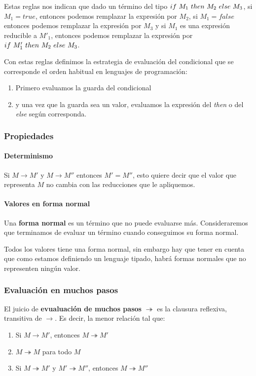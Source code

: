 \vspace*{5mm}
Estas reglas nos indican que dado un término del tipo $if~ M_1~ then~ M_2~ else~ M_3$, si $M_1 = true$, entonces podemos remplazar la expresión por $M_2$, si $M_1=false$ entonces podemos remplazar la expresión por $M_3$ y si $M_1$ es una expresión reducible a $M'_1$, entonces podemos remplazar la expresión por $if~ M'_1~ then~ M_2~ else~ M_3$.

Con estas reglas definimos la estrategia de evaluación del condicional que se corresponde el orden habitual en lenguajes de programación:
\begin{enumerate}
    \item Primero evaluamos la guarda del condicional
    \item y una vez que la guarda sea un valor, evaluamos la expresión del \textit{then} o del \textit{else} según corresponda.
\end{enumerate}

\subsubsection{Propiedades}

\paragraph{Determinismo} Si $M\to M'$ y $M\to M''$ entonces $M' = M''$, esto quiere decir que el valor que representa $M$ no cambia con las reducciones que le apliquemos.

\paragraph{Valores en forma normal} Una \textbf{forma normal} es un término que no puede evaluarse más. Consideraremos que terminamos de evaluar un término cuando conseguimos su forma normal.

Todos los valores tiene una forma normal, sin embargo hay que tener en cuenta que como estamos definiendo un lenguaje tipado, habrá formas normales que no representen ningún valor.

\subsubsection{Evaluación en muchos pasos}
El juicio de \textbf{evualuación de muchos pasos} $\twoheadrightarrow$ es la clausura reflexiva, transitiva de $\to$. Es decir, la menor relación tal que:
\begin{enumerate}
    \item Si $M\to M'$, entonces $M\twoheadrightarrow M'$
    \item $M\twoheadrightarrow M$ para todo $M$
    \item Si $M\twoheadrightarrow M'$ y $M' \twoheadrightarrow M''$, entonces $M\twoheadrightarrow M''$
\end{enumerate}

